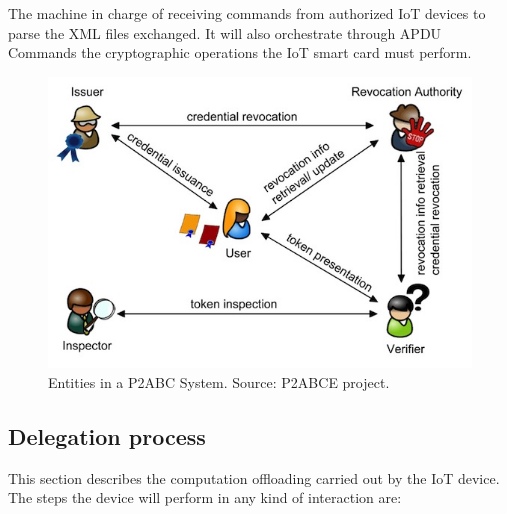 	The machine in charge of receiving commands from authorized IoT devices to parse the XML files exchanged. It will also orchestrate through APDU Commands the cryptographic operations the IoT smart card must perform.
	

\begin{figure}[bth]
	\centering
	\includegraphics[width=0.8\linewidth]{gfx/actors.jpg}
	\caption{Entities in a P2ABC System. Source: P2ABCE project.}
	\label{fig:actors}
\end{figure}


\subsection{Delegation process}

This section describes the computation offloading carried out by the IoT device. The steps the device will perform in any kind of interaction are:

